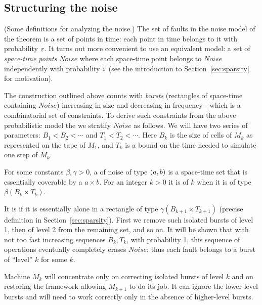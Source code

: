 \documentclass[11pt]{memoir}
\theoremstyle{definition} %
\def\B{B}
\newcommand{\Noise}{\mathit{Noise}}
\newcommand{\Tu}{T}
\begin{document}
\subsection{Structuring the noise}\label{sec:sparsity-informal}

(Some definitions for analyzing the noise.)
The set of faults in the noise model of the theorem is a
set of points in time: each point in time belongs to it with probability \( \varepsilon \).
It turns out more convenient to use an equivalent model:
a set of \emph{space-time points} \( \Noise \) where each space-time point belongs to \( \Noise \)
independently
with probability \( \varepsilon \) (see the introduction to Section~\ref{sec:sparsity} for motivation).

The construction outlined above counts with \emph{bursts} (rectangles of space-time
containing  \( \Noise \)) increasing in size and decreasing
in frequency---which is a combinatorial set of constraints.
To derive such constraints from the above probabilistic model
the  we stratify \( \Noise \) as follows.
We will have two series of parameters:  \( \B_{1}<\B_{2}<\dotsm \) and
\( \Tu_{1}<\Tu_{2}<\dotsm \).
Here \( \B_{k} \) is the size of cells of \( M_{k} \) as represented on the tape of \( M_{1} \),
and \( \Tu_{k} \) is a bound on the time needed to simulate one step of  \( M_{k} \).

\begin{definition}
For some constants \( \beta,\gamma>0 \),
a  of noise of type \( (a,b) \)
is a space-time set that is essentially coverable by a  \( a\times b \).
For an integer \( k>0 \) it is of  \( k \) when it is of type \( \beta(\B_{k}\times\Tu_{k}) \).
\end{definition}
It is  if it is 
essentially alone in a rectangle of type \( \gamma(\B_{k+1}\times\Tu_{k+1}) \) (precise definition in 
Section~\ref{sec:sparsity}).
First we remove such isolated bursts of level 1, then of level 2
from the remaining set, and so on.
It will be shown that with not too fast increasing sequences \( \B_{k},\Tu_{k} \), with probability 1,
this sequence of operations eventually completely erases \( \Noise \): thus each fault belongs to
a burst of ``level'' \( k \) for some \( k \).

Machine \( M_{k} \) will concentrate only on correcting isolated bursts of level \( k \) and on restoring
the framework allowing \( M_{k+1} \) to do its job.
It can ignore the lower-level bursts and will need to work correctly
only in the absence of higher-level bursts.
\end{document}
